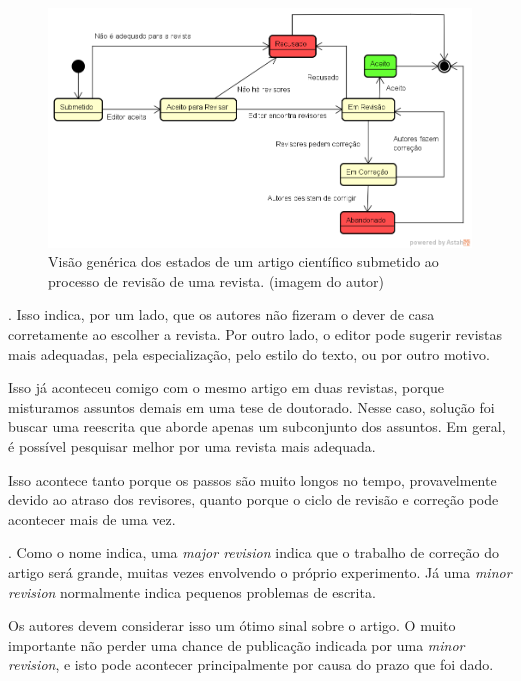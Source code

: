 \documentclass[openany]{book}
\begin{document}
\begin{figure}
    \centering
    \includegraphics[width=0.7\linewidth]{imagens/MaquinaEstadoArtigo.png}
    \caption[Visão genérica dos estados de um artigo científico]{Visão genérica dos estados de um artigo científico submetido ao processo de revisão de uma revista. (imagem do autor)}
    \label{fig:maquina}
\end{figure}

. Isso indica, por um lado, que os autores não fizeram o dever de casa corretamente ao escolher a revista. Por outro lado, o editor pode sugerir revistas mais adequadas, pela especialização, pelo estilo do texto, ou por outro motivo.


 Isso já aconteceu comigo com o mesmo artigo em duas revistas, porque misturamos assuntos demais em uma tese de doutorado. Nesse caso, solução foi buscar uma reescrita que aborde apenas um subconjunto dos assuntos. Em geral, é possível pesquisar melhor por uma revista mais adequada.

 Isso acontece tanto porque os passos são muito longos no tempo, provavelmente devido ao atraso dos revisores, quanto porque o ciclo de revisão e correção pode acontecer mais de uma vez.

. Como o nome indica, uma \textit{major revision} indica que o trabalho de correção do artigo será grande, muitas vezes envolvendo o próprio experimento. Já uma \textit{minor revision} normalmente indica pequenos problemas de escrita.

 Os autores devem considerar isso um ótimo sinal sobre o artigo. O muito importante não perder uma chance de publicação indicada por uma \textit{minor revision}, e isto pode acontecer principalmente por causa do prazo que foi dado.
\end{document}
